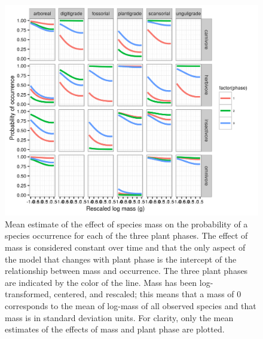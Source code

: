 \documentclass[12pt,letterpaper]{article}
\begin{document}
\begin{figure}[ht]
  \centering
  \includegraphics[width=\textwidth,height=0.4\textheight,keepaspectratio=true]{figure/mass_on_pres}
  \caption[Effect of mass on probability of species occurrence as estimated from the pure-presence model]{Mean estimate of the effect of species mass on the probability of a species occurrence for each of the three plant phases. The effect of mass is considered constant over time and that the only aspect of the model that changes with plant phase is the intercept of the relationship between mass and occurrence. The three plant phases are indicated by the color of the line. Mass has been log-transformed, centered, and rescaled; this means that a mass of 0 corresponds to the mean of log-mass of all observed species and that mass is in standard deviation units. For clarity, only the mean estimates of the effects of mass and plant phase are plotted.}
  \label{fig:mass_occur}
\end{figure}
\end{document}
